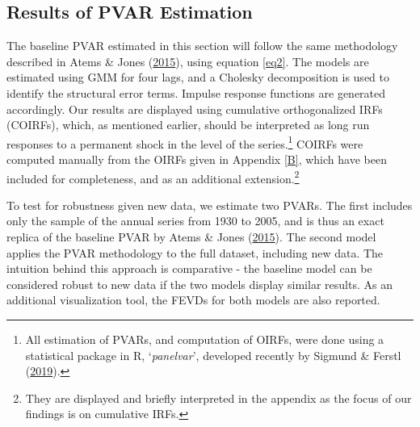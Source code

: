 \documentclass[11pt,preprint, authoryear]{elsarticle}
\numberwithin{equation}{section}
\numberwithin{figure}{section}
\numberwithin{table}{section}
\let\rmarkdownfootnote\footnote%
\def\footnote{\protect\rmarkdownfootnote}
\begin{document}
\hypertarget{results-of-pvar-estimation}{%
\subsection{\texorpdfstring{Results of PVAR Estimation
\label{Section 3.3}}{Results of PVAR Estimation }}\label{results-of-pvar-estimation}}

The baseline PVAR estimated in this section will follow the same
methodology described in Atems \& Jones
(\protect\hyperlink{ref-atems}{2015}), using equation \ref{eq2}. The
models are estimated using GMM for four lags, and a Cholesky
decomposition is used to identify the structural error terms. Impulse
response functions are generated accordingly. Our results are displayed
using cumulative orthogonalized IRFs (COIRFs), which, as mentioned
earlier, should be interpreted as long run responses to a permanent
shock in the level of the series.\footnote{All estimation of PVARs, and
  computation of OIRFs, were done using a statistical package in R,
  `\emph{panelvar}', developed recently by Sigmund \& Ferstl
  (\protect\hyperlink{ref-sigmund2019panel}{2019}).} COIRFs were
computed manually from the OIRFs given in Appendix \ref{B}, which have
been included for completeness, and as an additional
extension.\footnote{They are displayed and briefly interpreted in the
  appendix as the focus of our findings is on cumulative IRFs.}

To test for robustness given new data, we estimate two PVARs. The first
includes only the sample of the annual series from 1930 to 2005, and is
thus an exact replica of the baseline PVAR by Atems \& Jones
(\protect\hyperlink{ref-atems}{2015}). The second model applies the PVAR
methodology to the full dataset, including new data. The intuition
behind this approach is comparative - the baseline model can be
considered robust to new data if the two models display similar results.
As an additional visualization tool, the FEVDs for both models are also
reported.
\end{document}
